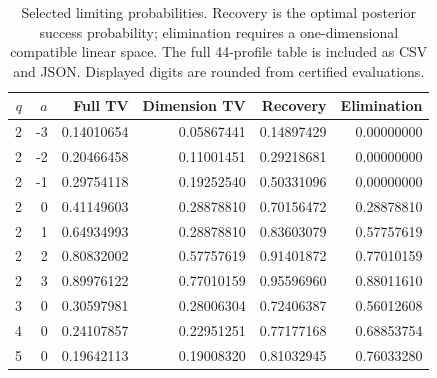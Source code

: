 \begin{table}[htbp]
\centering\small
\begin{tabular}{@{}rrrrrr@{}}
\toprule
$q$ & $a$ & Full TV & Dimension TV & Recovery & Elimination \\
\midrule
2 & -3 & 0.14010654 & 0.05867441 & 0.14897429 & 0.00000000 \\
2 & -2 & 0.20466458 & 0.11001451 & 0.29218681 & 0.00000000 \\
2 & -1 & 0.29754118 & 0.19252540 & 0.50331096 & 0.00000000 \\
2 & 0 & 0.41149603 & 0.28878810 & 0.70156472 & 0.28878810 \\
2 & 1 & 0.64934993 & 0.28878810 & 0.83603079 & 0.57757619 \\
2 & 2 & 0.80832002 & 0.57757619 & 0.91401872 & 0.77010159 \\
2 & 3 & 0.89976122 & 0.77010159 & 0.95596960 & 0.88011610 \\
3 & 0 & 0.30597981 & 0.28006304 & 0.72406387 & 0.56012608 \\
4 & 0 & 0.24107857 & 0.22951251 & 0.77177168 & 0.68853754 \\
5 & 0 & 0.19642113 & 0.19008320 & 0.81032945 & 0.76033280 \\
\bottomrule
\end{tabular}
\caption{Selected limiting probabilities. Recovery is the optimal posterior success probability; elimination requires a one-dimensional compatible linear space. The full 44-profile table is included as CSV and JSON. Displayed digits are rounded from certified evaluations.}
\label{tab:selected-profiles}
\end{table}
